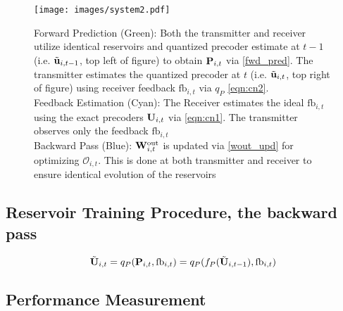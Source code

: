 \documentclass[conference]{IEEEtran}
\begin{document}
\begin{figure*}[ht]
\centering
\texttt{[image: images/system2.pdf]}

\caption{Forward Prediction (Green): Both the transmitter and receiver utilize identical reservoirs and quantized precoder estimate at $t-1$ (i.e. $\tilde{{\bf u}}_{i,t-1}$, top left of figure) to obtain ${\bf P}_{i,t}$ via \eqref{fwd_pred}. The transmitter estimates the quantized precoder at $t$ (i.e. $\tilde{{\bf u}}_{i,t}$, top right of figure) using receiver feedback $\text{fb}_{i,t}$ via $q_P$ \eqref{eqn:cn2}. 
\\Feedback Estimation (Cyan): The Receiver estimates the ideal $\text{fb}_{i,t}$ using the exact precoders ${\bf U}_{i,t}$ via \eqref{eqn:cn1}. The transmitter observes only the feedback $\text{fb}_{i,t}$\\ Backward Pass (Blue): ${\bf W}^{\text{out}}_{i,t}$ is updated via \eqref{wout_upd} for optimizing $\mathcal{O}_{i,t}$. This is done at both transmitter and receiver to ensure identical evolution of the reservoirs} 
\label{res_overview}
\vspace{-5pt}
\end{figure*}

\subsection{Reservoir Training Procedure, the backward pass}
\label{train}

\begin{equation}
\tilde{\bU}_{i,t}=q_P(\bP_{i,t},\text{fb}_{i,t})=q_P(f_P(\tilde{\bU}_{i,t-1}),\text{fb}_{i,t})
\label{fpqp}
\end{equation} %


\subsection{Performance Measurement}
\label{setting}
\end{document}
